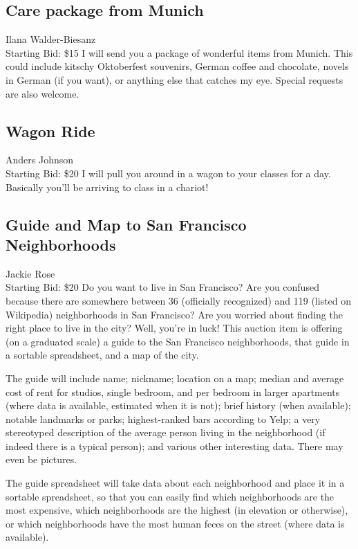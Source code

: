 \documentclass[11pt]{article}
\begin{document}
\subsection{Care package from Munich}
Ilana Walder-Biesanz
\\
Starting Bid: \$15
\newline
I will send you a package of wonderful items from Munich. This could include kitschy Oktoberfest souvenirs, German coffee and chocolate, novels in German (if you want), or anything else that catches my eye. Special requests are also welcome.
\subsection{Wagon Ride}
Anders Johnson
\\
Starting Bid: \$20
\newline
I will pull you around in a wagon to your classes for a day.  Basically you'll be arriving to class in a chariot!
\subsection{Guide and Map to San Francisco Neighborhoods}
Jackie Rose
\\
Starting Bid: \$20
\newline
Do you want to live in San Francisco? Are you confused because there are somewhere between 36 (officially recognized) and 119 (listed on Wikipedia) neighborhoods in San Francisco? Are you worried about finding the right place to live in the city? Well, you're in luck! This auction item is offering (on a graduated scale) a guide to the San Francisco neighborhoods, that guide in a sortable spreadsheet, and a map of the city.

The guide will include name; nickname; location on a map; median and average cost of rent for studios, single bedroom, and per bedroom in larger apartments (where data is available, estimated when it is not); brief history (when available); notable landmarks or parks; highest-ranked bars according to Yelp; a very stereotyped description of the average person living in the neighborhood (if indeed there is a typical person); and various other interesting data. There may even be pictures.

The guide spreadsheet will take data about each neighborhood and place it in a sortable spreadsheet, so that you can easily find which neighborhoods are the most expensive, which neighborhoods are the highest (in elevation or otherwise), or which neighborhoods have the most human feces on the street (where data is available).
\end{document}
